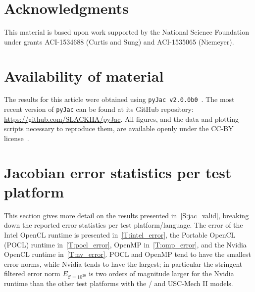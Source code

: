 \documentclass[12pt,number,sort&compress,preprint]{elsarticle}
\begin{document}
\section{Acknowledgments}
This material is based upon work supported by the National Science Foundation
under grants ACI-1534688 (Curtis and Sung) and ACI-1535065 (Niemeyer).

\pagebreak

\appendix
\setcounter{figure}{0}
\setcounter{table}{0}

\renewcommand*{\thesection}{\appendixname~\Alph{section}}

\section{Availability of material}
\label{A:availability}

The results for this article were obtained using \texttt{pyJac v2.0.0b0}~\cite{pyjac2}.
The most recent version of \texttt{pyJac} can be found at its GitHub repository:
\url{https://github.com/SLACKHA/pyJac}.
All figures, and the data and plotting scripts necessary to reproduce them,
are available openly under the CC-BY license~\cite{data}.

\section{Jacobian error statistics per test platform}
\label{A:per_platform}

This section gives more detail on the results presented in~\cref{S:jac_valid}, breaking down the reported error statistics per test platform\slash language.
The error of the Intel OpenCL runtime is presented in~\cref{T:intel_error}, the Portable OpenCL (POCL) runtime in~\cref{T:pocl_error}, OpenMP in~\cref{T:omp_error}, and the Nvidia OpenCL runtime in~\cref{T:nv_error}.
POCL and OpenMP tend to have the smallest error norms, while Nvidia tends to have the largest; in particular the stringent filtered error norm $E_{\mathcal{C} = 10^{20}}$ is two orders of magnitude larger for the Nvidia runtime than the other test platforms with the \slash{} and USC-Mech II models.
\end{document}
